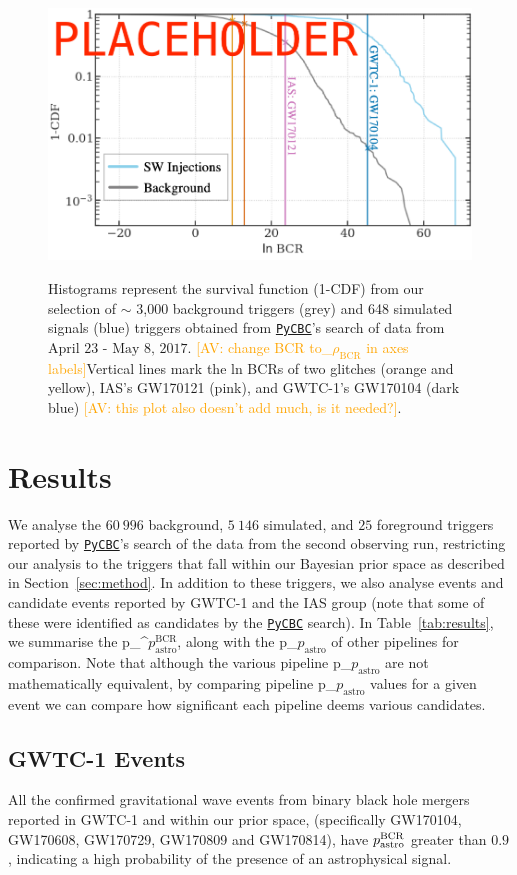 \documentclass[%
 nofootinbib,
 amsmath,amssymb,
 aps,
 twocolumn
]{revtex4-2}
\newcommand{\pycbc}{{\sc \href{https://pycbc.org/}{\texttt{PyCBC}}}\xspace}
\newcommand{\fancytext}[1]{{\relax\ifmmode#1\else $#1$\fi}\xspace}
\newcommand{\mathcmd}[1]{{\sc \relax\ifmmode#1\else $#1$\fi}\xspace}
\newcommand{\bcr}{\mathcmd{\rho_\text{BCR}}}
\newcommand{\pastro}{\fancytext{p_\text{astro}}}
\newcommand{\pastrobcr}{\fancytext{p_\text{astro}^{\text{BCR}}}}
\newcommand{\av}[1]{\textcolor{orange}{[AV: #1]}}
\begin{document}
\begin{figure}[!ht]
{\centering \includegraphics[width=0.75\linewidth]{images/bcr_cdf} }
\caption[BCR distribution example]{Histograms represent the survival function (1-CDF) from our selection of $\sim$ 3,000 background triggers (grey) and 648 simulated signals (blue) triggers obtained from \pycbc's search of data from $\text{April 23 - May 8, 2017}$. \av{change BCR to\bcr in axes labels}Vertical lines mark the ln BCRs of two glitches (orange and yellow), IAS's GW170121 (pink), and GWTC-1's GW170104 (dark blue) \av{this plot also doesn't add much, is it needed?}.}\label{fig:bcrCdf}
\end{figure}





\section{\label{sec:Results}Results}




We analyse the $60\ 996$ background, $5\ 146$ simulated, and $25$ foreground triggers reported by \pycbc's search of the data from the second observing run, restricting our analysis to the triggers that fall within our Bayesian prior space as described in Section~\ref{sec:method}. In addition to these triggers, we also analyse events and candidate events reported by GWTC-1 and the IAS group (note that some of these were identified as candidates by the \pycbc search). In Table~\ref{tab:results}, we summarise the \pastrobcr, along with the \pastro of other pipelines for comparison. Note that although the various pipeline \pastro are not mathematically equivalent, by comparing pipeline \pastro values for a given event we can compare how significant each pipeline deems various candidates.  


\subsection{GWTC-1 Events}
All the confirmed gravitational wave events from binary black hole mergers reported in GWTC-1 and within our prior space, (specifically GW170104, GW170608, GW170729, GW170809 and GW170814), have $\pastrobcr$ greater than $0.9$, indicating a high probability of the presence of an astrophysical signal. 
\end{document}
